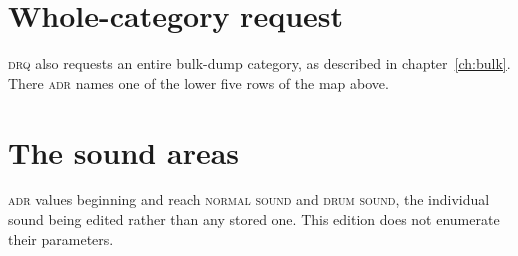 \section{Whole-category request}
\textsc{drq} also requests an entire bulk-dump category, as described in
chapter~\ref{ch:bulk}. There \textsc{adr} names one of the lower five rows of the map
above.

\section{The sound areas}
\textsc{adr} values beginning  and  reach \textsc{normal sound} and
\textsc{drum sound}, the individual sound being edited rather than any stored one. This
edition does not enumerate their parameters.
